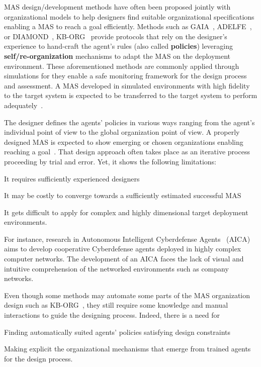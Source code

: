 MAS design/development methods have often been proposed jointly with organizational models to help designers find suitable organizational specifications enabling a MAS to reach a goal efficiently. Methods such as GAIA~\cite{Wooldridge2000,Cernuzzi2014}, ADELFE~\cite{Mefteh2015}, or DIAMOND~\cite{Jamont2015}, KB-ORG~\cite{Sims2008} provide protocols that rely on the designer's experience to hand-craft the agent's rules (also called \textbf{policies}) leveraging \textbf{self/re-organization} mechanisms to adapt the MAS on the deployment environment.
These aforementioned methods are commonly applied through simulations for they enable a safe monitoring framework for the design process and assessment. A MAS developed in simulated environments with high fidelity to the target system is expected to be transferred to the target system to perform adequately~\cite{Schon2021}.

The designer defines the agents' policies in various ways ranging from the agent's individual point of view to the global organization point of view. A properly designed MAS is expected to show emerging or chosen organizations enabling reaching a goal~\cite{Picard2009reorganisation}. That design approach often takes place as an iterative process proceeding by trial and error. Yet, it shows the following limitations:
\begin{enumerate*}[label=\roman*),itemjoin={;\quad}]
  \item It requires sufficiently experienced designers
  \item It may be costly to converge towards a sufficiently estimated successful MAS
  \item It gets difficult to apply for complex and highly dimensional target deployment environments.
\end{enumerate*}
For instance, research in Autonomous Intelligent Cyberdefense Agents~\cite{Kott2023} (AICA) aims to develop cooperative Cyberdefense agents deployed in highly complex computer networks. The development of an AICA faces the lack of visual and intuitive comprehension of the networked environments such as company networks.


Even though some methods may automate some parts of the MAS organization design such as KB-ORG~\cite{Sims2008}, they still require some knowledge and manual interactions to guide the designing process. Indeed, there is a need for
\begin{enumerate*}[label=\roman*),itemjoin={; and \ }]
  \item Finding automatically suited agents' policies satisfying design constraints
  \item Making explicit the organizational mechanisms that emerge from trained agents for the design process.
\end{enumerate*}

